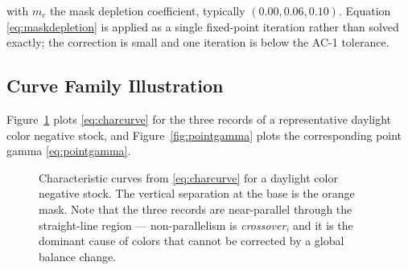 with $m_c$ the mask depletion coefficient, typically $(0.00, 0.06, 0.10)$.
Equation \eqref{eq:maskdepletion} is applied as a single fixed-point iteration
rather than solved exactly; the correction is small and one iteration is
below the AC-1 tolerance.

\subsection{Curve Family Illustration}

Figure~\ref{fig:charcurve} plots \eqref{eq:charcurve} for the three records of a
representative daylight color negative stock, and
Figure~\ref{fig:pointgamma} plots the corresponding point gamma
\eqref{eq:pointgamma}.

\begin{figure}[htbp]
\centering
{}
\caption{Characteristic curves from \eqref{eq:charcurve} for a daylight color negative stock. The vertical separation at the base is the orange mask. Note that the three records are near-parallel through the straight-line region --- non-parallelism is \emph{crossover}, and it is the dominant cause of colors that cannot be corrected by a global balance change.}
\label{fig:charcurve}
\end{figure}

